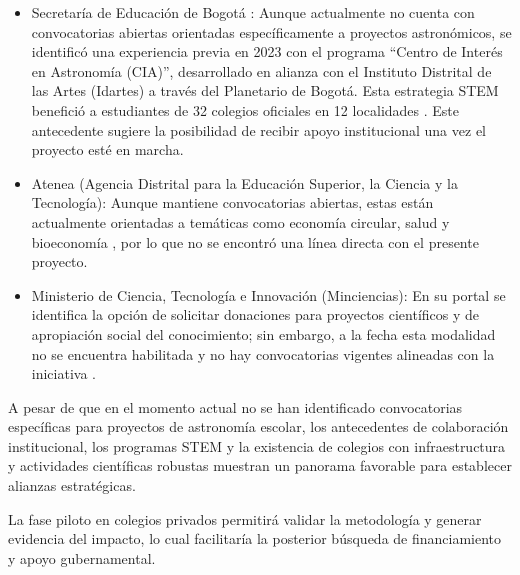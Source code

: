 \begin{itemize}
\item Secretaría de Educación de Bogotá \cite{sedbogota}:
Aunque actualmente no cuenta con convocatorias abiertas orientadas
específicamente a proyectos astronómicos, se identificó una experiencia
previa en 2023 con el programa ``Centro de Interés en Astronomía (CIA)'',
desarrollado en alianza con el Instituto Distrital de las Artes (Idartes) a
través del Planetario de Bogotá.
Esta estrategia STEM benefició a estudiantes de 32 colegios oficiales en 12
localidades \cite{sed2023}.
Este antecedente sugiere la posibilidad de recibir apoyo institucional una
vez el proyecto esté en marcha.

\item Atenea (Agencia Distrital para la Educación Superior, la Ciencia y la
Tecnología): Aunque mantiene convocatorias abiertas, estas están actualmente
orientadas a temáticas como economía circular, salud y bioeconomía
\cite{atenea2024}, por lo que no se encontró una línea directa con el
presente proyecto.

\item Ministerio de Ciencia, Tecnología e Innovación (Minciencias):
En su portal se identifica la opción de solicitar donaciones para proyectos
científicos y de apropiación social del conocimiento; sin embargo, a la fecha
esta modalidad no se encuentra habilitada y no hay convocatorias
vigentes alineadas con la iniciativa \cite{minciencias2024}.
\end{itemize}

A pesar de que en el momento actual no se han identificado convocatorias
específicas para proyectos de astronomía escolar, los antecedentes de
colaboración institucional, los programas STEM y la existencia de colegios
con infraestructura y actividades científicas robustas muestran un panorama
favorable para establecer alianzas estratégicas.

La fase piloto en colegios privados permitirá validar la metodología y generar
evidencia del impacto, lo cual facilitaría la posterior búsqueda de
financiamiento y apoyo gubernamental.
